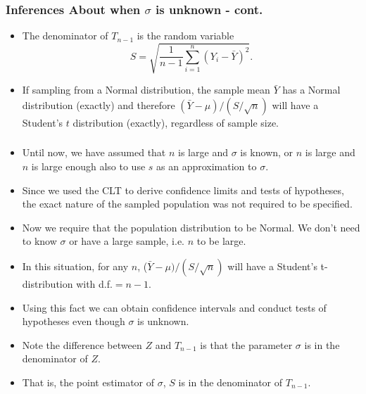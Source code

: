 \documentclass[xcolor=dvipsnames,12pt]{beamer}
\begin{document}
\begin{frame}
\frametitle{{Inferences About \boldmath{$\mu$} when $\sigma$ is unknown - cont.}}
\begin{itemize}
\item The denominator of $T_{n-1}$ is the random variable
$$
  S = \sqrt{\frac{1}{n-1} \sum_{i=1}^n (Y_i - \bar{Y})^2}.
$$
\item If sampling from a Normal distribution, the sample mean  
$\bar{Y}$ has a Normal distribution (exactly) and therefore
$(\bar{Y}-\mu)/(S/\sqrt{n})$ will have a Student's $t$ distribution
(exactly),  regardless of sample size.
\end{itemize}
\end{frame}



\begin{frame}
\frametitle{}
\begin{itemize}
\item Until now, we have assumed that $n$ is large and
$\sigma$ is known, or $n$ is large and  $n$ is large enough also to
use $s$ as an  approximation to $\sigma$.  
\item Since we used the CLT to derive confidence limits and tests of hypotheses, 
 the exact nature of the sampled population was not required to be specified.

\item Now we require that  the population distribution to be Normal. 
We don't need to know $\sigma$ or have a large sample, i.e. $n$ to be large.
\item In this situation, for any $n$, ($\bar{Y} - \mu)/(S/\sqrt{n})$
will have a Student's t-distribution with d.f.$= n-1.$

\item Using this fact we can obtain confidence intervals and 
conduct tests of hypotheses even though $\sigma$ is unknown.  

\item Note the difference between $Z$ and $T_{n-1}$
is that the parameter $\sigma$ is in the denominator of $Z$.
\item That is, the point estimator of $\sigma$, $S$ is in the denominator of
$T_{n-1}$.
\end{itemize}
\end{frame}
\end{document}
